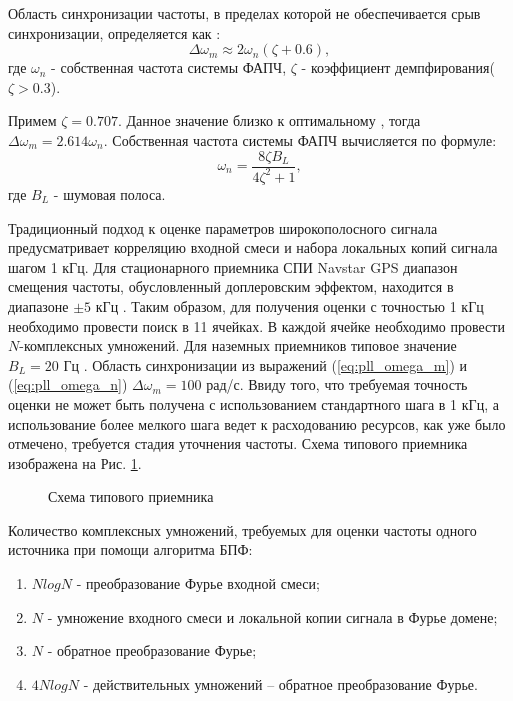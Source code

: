 Область синхронизации частоты, в пределах которой не обеспечивается срыв синхронизации, определяется как \cite{spilker-book}:
\begin{equation}
	\label{eq:pll_omega_m}
	\Delta \omega_m \approx 2 \omega_n (\zeta+0.6),
\end{equation}
где ${\omega_n}$ - собственная частота системы ФАПЧ, ${\zeta}$ - коэффициент демпфирования(${\zeta > 0.3}$).

Примем ${\zeta = 0.707}$. Данное значение   близко к оптимальному \cite{tsui, spilker-book}, тогда ${\Delta \omega_m = 2.614 \omega_n}$.
Собственная частота системы ФАПЧ вычисляется по формуле:
\begin{equation}
	\label{eq:pll_omega_n}
	\omega_n = \frac{8 \zeta B_L}{4 \zeta^2 + 1},
\end{equation}
где ${B_L}$ - шумовая полоса.

Традиционный подход к оценке параметров широкополосного сигнала предусматривает корреляцию входной смеси и набора локальных копий сигнала шагом 1 кГц.
Для стационарного приемника СПИ Navstar GPS диапазон смещения частоты, обусловленный доплеровским эффектом, находится в диапазоне ${\pm 5}$ кГц \cite{tsui, shahtarin_sync}.
Таким образом, для получения оценки с точностью 1 кГц необходимо провести поиск в 11 ячейках. В каждой ячейке необходимо провести ${N}$-комплексных умножений.
Для наземных приемников типовое значение ${B_L=20}$ Гц \cite{tsui}. Область синхронизации из выражений (\ref{eq:pll_omega_m}) и (\ref{eq:pll_omega_n})
${\Delta \omega_m = 100}$ рад/с. Ввиду того, что требуемая точность оценки не может быть получена с использованием стандартного шага в 1 кГц,
а использование более мелкого шага ведет к расходованию ресурсов, как уже было отмечено, требуется стадия уточнения частоты.
Схема типового приемника изображена на Рис. \ref{pic:corr_scheme}.
\begin{figure}[h]
	\center{}
	\caption{Схема типового приемника}
	\label{pic:corr_scheme}
\end{figure}

Количество комплексных умножений, требуемых для оценки частоты одного источника при помощи алгоритма БПФ:
\begin{enumerate}
\item ${NlogN}$ - преобразование Фурье входной смеси;
\item ${N}$ - умножение входного смеси и локальной копии сигнала в Фурье домене;
\item ${N}$ - обратное преобразование Фурье;
\item ${4NlogN}$ - действительных умножений – обратное преобразование Фурье. 
\end{enumerate}

